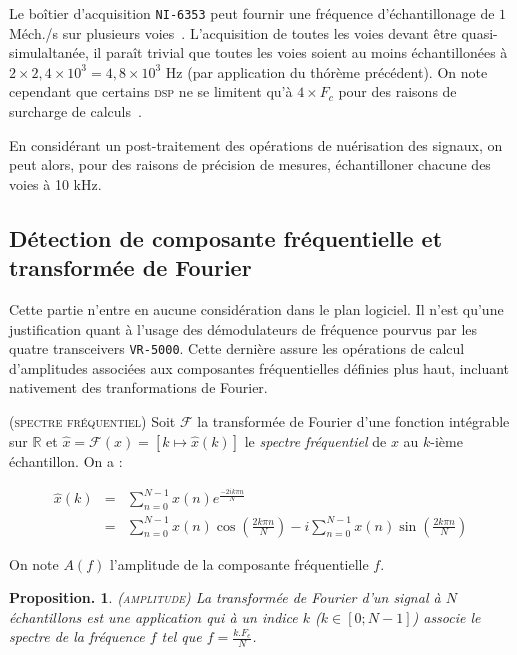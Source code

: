 \documentclass[twocolumn,pre,floats,aps,amsmath,amssymb]{revtex4}
\newtheorem{proposition}[theorem]{Proposition.}
\newenvironment{definition}[1][D\'efinition.]{\begin{trivlist}
\item[\hskip \labelsep {\bfseries #1}]}{\end{trivlist}}
\begin{document}
Le bo\^itier d'acquisition \texttt{NI-6353} peut fournir une fr\'equence d'\'echantillonage de $1$ M\'ech./s sur plusieurs voies~\cite{NI_6353_datasheet}. L'acquisition de toutes les voies devant \^etre quasi-simulaltan\'ee, il para\^it trivial que toutes les voies soient au moins \'echantillon\'ees \`a $2 \times 2,4 \times 10^3 = 4,8 \times 10^3$ Hz (par application du th\'or\`eme pr\'ec\'edent). On note cependant que certains \textsc{dsp} ne se limitent qu'\`a $4 \times F_c$ pour des raisons de surcharge de calculs~\cite{TI_MSP430}.

En consid\'erant un post-traitement des op\'erations de nu\'erisation des signaux, on peut alors, pour des raisons de pr\'ecision de mesures, \'echantilloner chacune des voies \`a 10 kHz.

\subsection{D\'etection de composante fr\'equentielle et transform\'ee de Fourier}

{ \color{rltred}{\Radioactivity} } Cette partie n'entre en aucune consid\'eration dans le plan logiciel. Il n'est qu'une justification quant \`a l'usage des d\'emodulateurs de fr\'equence pourvus par les quatre transceivers \texttt{VR-5000}. Cette derni\`ere assure les op\'erations de calcul d'amplitudes associ\'ees aux composantes fr\'equentielles d\'efinies plus haut, incluant nativement des tranformations de Fourier.

\begin{definition}
\textsc{(spectre fr\'equentiel)}
Soit $\mathcal{F}$ la transform\'ee de Fourier d'une fonction int\'egrable sur $\mathbb{R}$ et $\hat{x} = \mathcal{F}(x) = \left [ k \mapsto \hat{x}(k)\right ]$ le \textit{spectre fr\'equentiel} de $x$ au $k$-i\`eme \'echantillon. On a\cite{Senlis} :

\begin{eqnarray*}
\hat{x}(k) &=& \sum^{N - 1}_{n = 0}{x(n)e^{\frac{-2ik \pi n}{N}}}\\
           &=& \sum^{N - 1}_{n = 0}{x(n)\cos \left ( \frac{2k \pi n}{N} \right )} - i\sum^{N - 1}_{n = 0}{x(n)\sin \left ( \frac{2k \pi n}{N} \right )}
\end{eqnarray*}
\end{definition}

On note $A (f)$ l'amplitude de la composante fr\'equentielle $f$.

\begin{proposition}
\textsc{(amplitude)}
La transform\'ee de Fourier d'un signal \`a $N$ \'echantillons est une application qui \`a un indice $k$ ($k \in [0 ; N - 1]$) associe le spectre de la fr\'equence $f$ tel que $f = \frac{k.F_e}{N}$.
\end{proposition}
\end{document}
